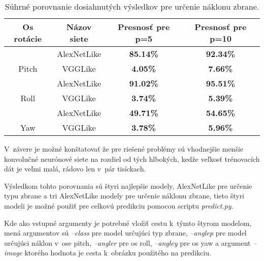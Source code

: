 \begin{table}[H]
    \centering
    \begin{tabular}{|c|c|c|c|}
        \hline
        {\color[HTML]{000000} Os rotácie}              & {\color[HTML]{000000} Názov siete} & {\color[HTML]{000000} Presnosť pre p=5} & {\color[HTML]{000000} Presnosť pre p=10} \\ \hline
        {\color[HTML]{000000} }                        & {\color[HTML]{000000} AlexNetLike} & {\color[HTML]{009901} \textbf{85.14\%}} & {\color[HTML]{009901} \textbf{92.34\%}}  \\
        \multirow{-2}{*}{{\color[HTML]{000000} Pitch}} & {\color[HTML]{000000} VGGLike}     & {\color[HTML]{9A0000} \textbf{4.05\%}}  & {\color[HTML]{9A0000} \textbf{7.66\%}}   \\ \hline
        {\color[HTML]{000000} }                        & {\color[HTML]{000000} AlexNetLike} & {\color[HTML]{009901} \textbf{91.02\%}} & {\color[HTML]{009901} \textbf{95.51\%}}  \\
        \multirow{-2}{*}{{\color[HTML]{000000} Roll}}  & {\color[HTML]{000000} VGGLike}     & {\color[HTML]{9A0000} \textbf{3.74\%}}  & {\color[HTML]{9A0000} \textbf{5.39\%}}   \\ \hline
        {\color[HTML]{000000} }                        & {\color[HTML]{000000} AlexNetLike} & {\color[HTML]{009901} \textbf{49.71\%}} & {\color[HTML]{009901} \textbf{54.65\%}}  \\
        \multirow{-2}{*}{{\color[HTML]{000000} Yaw}}   & {\color[HTML]{000000} VGGLike}     & {\color[HTML]{9A0000} \textbf{3.78\%}}  & {\color[HTML]{9A0000} \textbf{5.96\%}}   \\ \hline
    \end{tabular}
    \caption{Súhrné porovnanie dosiahnutých výsledkov pre určenie náklonu zbrane.}
    \label{tab:allresultsangle}
\end{table}

V~závere je možné konštatovať že pre riešené problémy sú vhodnejšie menšie konvolučné neurónové siete na rozdiel od tých hlbokých, kedže
    veľkosť trénovacích dát je veľmi malá, rádovo len v~pár tisíckach.

Výsledkom tohto porovnania sú štyri najlepšie modely, AlexNetLike pre určenie typu zbrane a tri AlexNetLike modely pre určenie náklonu zbrane,
    tieto štyri modeli je možné použiť pre celkovú predikciu pomocou scriptu \textit{predict.py}.

Kde ako vstupné argumenty je potrebné vložiť cestu k~týmto štyrom modelom, mená argumentov sú \textit{--class} pre model určujúci typ zbrane,
    \textit{--anglep} pre model určujúci náklon v~ose pitch, \textit{--angler} pre os roll, \textit{--angley} pre os yaw a argument
    \textit{--image} ktorého hodnota je cesta k~obrázku použitého na predikciu.
